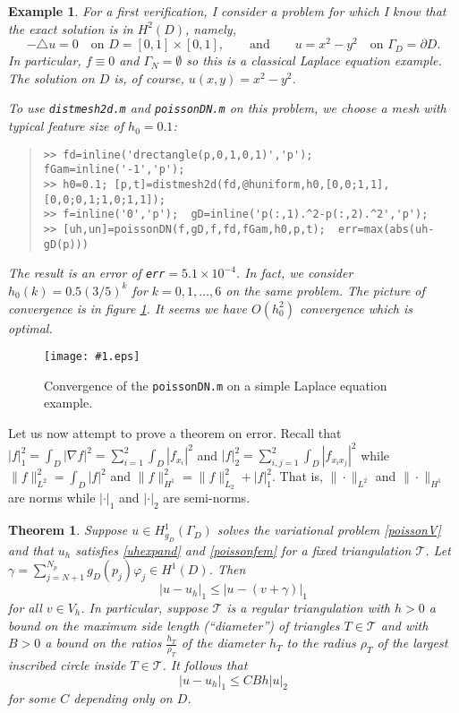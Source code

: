 \documentclass[12pt]{amsart}
\newtheorem{thm}{Theorem}
\newtheorem{example}{Example}
\theoremstyle{definition}
\newcommand{\mtt}{\texttt}
\newcommand{\regfigure}[2]{\texttt{[image: \#1.eps]}}
\newcommand{\calT}{\mathcal{T}}
\newcommand{\grad}{\nabla}
\newcommand{\lap}{\triangle}
\newcommand{\vf}{\varphi}
\begin{document}
\begin{example}  For a first verification, I consider a problem for which I know that the exact solution is in $H^2(D)$, namely,
    $$-\lap u = 0 \quad \text{on } D=[0,1]\times[0,1], \qquad \text{and} \qquad u=x^2-y^2 \quad \text{on } \Gamma_D=\partial D.$$
In particular, $f\equiv 0$ and $\Gamma_N=\emptyset$ so this is a classical Laplace equation example.  The solution on $D$ is, of course, $u(x,y)=x^2-y^2$.

To use \emph{\mtt{distmesh2d.m}} and \emph{\mtt{poissonDN.m}} on this problem, we choose a mesh with typical feature size of $h_0=0.1$:
\small\begin{quote}\begin{verbatim}
>> fd=inline('drectangle(p,0,1,0,1)','p');  fGam=inline('-1','p'); 
>> h0=0.1; [p,t]=distmesh2d(fd,@huniform,h0,[0,0;1,1],[0,0;0,1;1,0;1,1]);
>> f=inline('0','p');  gD=inline('p(:,1).^2-p(:,2).^2','p');
>> [uh,un]=poissonDN(f,gD,f,fd,fGam,h0,p,t);  err=max(abs(uh-gD(p)))
\end{verbatim}
\end{quote}\normalsize

The result is an error of \emph{\mtt{err}}$= 5.1\times 10^{-4}$.  In fact, we consider $h_0(k)=0.5 (3/5)^k$ for $k=0,1,\dots,6$ on the same problem.  The picture of convergence is in figure \ref{convtestDNsq}.  It seems we have $O(h_0^2)$ convergence which is optimal.
\end{example}

\begin{figure}[ht]
\regfigure{testDNsqerr}{2.4}
\caption{Convergence of the \mtt{poissonDN.m} on a simple Laplace equation example.}\label{convtestDNsq}
\end{figure}

Let us now attempt to prove a theorem on error.  Recall that $|f|_1^2 = \int_D |\grad f|^2 = \sum_{i=1}^2 \int_D \left|f_{x_i}\right|^2$ and $|f|_2^2 = \sum_{i,j=1}^2 \int_D \left|f_{x_i x_j}\right|^2$ while $\|f\|_{L^2}^2 = \int_D |f|^2$ and $\|f\|_{H^1}^2 = \|f\|_{L_2}^2 + |f|_1^2$.  That is, $\|\cdot\|_{L^2}$ and $\|\cdot\|_{H^1}$ are norms while $|\cdot|_1$ and $|\cdot|_2$ are semi-norms.

\begin{thm}\label{thm:semibound}  Suppose $u\in H_{g_D}^1(\Gamma_D)$ solves the variational problem \eqref{poissonV} and that $u_h$ satisfies \eqref{uhexpand} and \eqref{poissonfem} for a fixed triangulation $\calT$.  Let $\gamma = \sum_{j=N+1}^{N_p} g_D(p_j)\vf_j\in H^1(D)$.  Then
\begin{equation}\label{affineerror}
|u-u_h|_1 \le |u-(v+\gamma)|_1
\end{equation}
for all $v\in V_h$.  In particular, suppose $\calT$ is a \emph{regular} triangulation with $h>0$ a bound on the maximum side length (``diameter'') of triangles $T\in\calT$ and with $B>0$ a bound on the ratios $\frac{h_T}{\rho_T}$ of the diameter $h_T$ to the radius $\rho_T$ of the largest inscribed circle inside $T\in \calT$.  It follows that 
\begin{equation}\label{errorbound}
|u-u_h|_1 \le C B h |u|_2
\end{equation}
for some $C$ depending only on $D$.
\end{thm}
\end{document}

